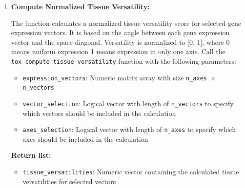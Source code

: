 \begin{enumerate}
\begin{enumerate}
                  \textbf{Return list:}
                  \begin{itemize}
                    \item \texttt{is\_outlier}: Logical vector indicating whether each gene
                          is an outlier
                          
                    \item \texttt{threshold}: Actual threshold value used for outlier detection
                  \end{itemize}
                  \begin{lstlisting}[language=R, caption={R Identify Outliers}]
tox_identify_outliers(rdi, percentile)
                  \end{lstlisting}
          \end{enumerate}
          
    \item \textbf{Compute Normalized Tissue Versatility:}
          
          The function calculates a normalized tissue versatility score for selected
          gene expression vectors. It is based on the angle between each gene
          expression vector and the space diagonal. Versatility is normalized to [0,
          1], where 0 means uniform expression 1 means expression in only one axis.
          Call the \texttt{tox\_compute\_tissue\_versatility} function with the following
          parameters:
          
          \begin{itemize}
            \item \texttt{expression\_vectors}: Numeric matrix array with size \texttt{n\_axes
                  $\times$ n\_vectors}
            
            \item \texttt{vector\_selection}: Logical vector with length of \texttt{n\_vectors}
                  to specify which vectors should be included in the calculation
                  
            \item \texttt{axes\_selection}: Logical vector with length of \texttt{n\_axes}
                  to specify which axes should be included in the calculation
          \end{itemize}
          
          \textbf{Return list:}
          \begin{itemize}
            \item \texttt{tissue\_versatilities}: Numeric vector containing the calculated
                  tissue versatilities for selected vectors
                  

\end{itemize}
\end{enumerate}

